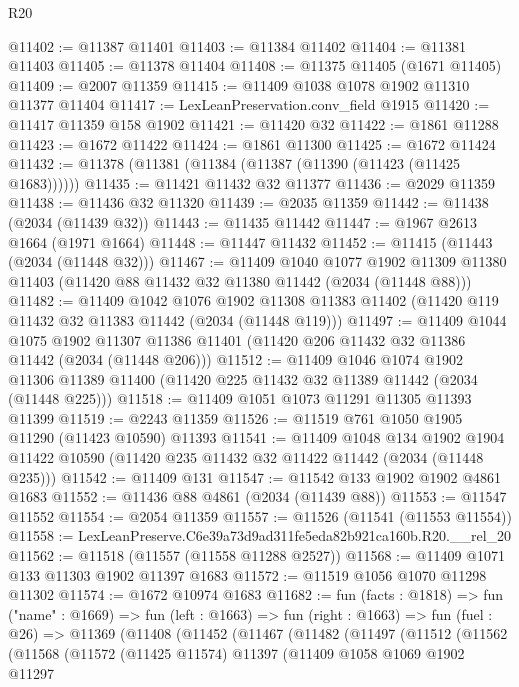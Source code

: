 \begin{lexlean}{R20}
\begin{coremodule}
@11402 := @11387 @11401
@11403 := @11384 @11402
@11404 := @11381 @11403
@11405 := @11378 @11404
@11408 := @11375 @11405 (@1671 @11405)
@11409 := @2007 @11359
@11415 := @11409 @1038 @1078 @1902 @11310 @11377 @11404
@11417 := LexLeanPreservation.conv_field @1915
@11420 := @11417 @11359 @158 @1902
@11421 := @11420 @32
@11422 := @1861 @11288
@11423 := @1672 @11422
@11424 := @1861 @11300
@11425 := @1672 @11424
@11432 := @11378 (@11381 (@11384 (@11387 (@11390 (@11423 (@11425 @1683))))))
@11435 := @11421 @11432 @32 @11377
@11436 := @2029 @11359
@11438 := @11436 @32 @11320
@11439 := @2035 @11359
@11442 := @11438 (@2034 (@11439 @32))
@11443 := @11435 @11442
@11447 := @1967 @2613 @1664 (@1971 @1664)
@11448 := @11447 @11432
@11452 := @11415 (@11443 (@2034 (@11448 @32)))
@11467 := @11409
    @1040
    @1077
    @1902
    @11309
    @11380
    @11403
    (@11420 @88 @11432 @32 @11380 @11442 (@2034 (@11448 @88)))
@11482 := @11409
    @1042
    @1076
    @1902
    @11308
    @11383
    @11402
    (@11420 @119 @11432 @32 @11383 @11442 (@2034 (@11448 @119)))
@11497 := @11409
    @1044
    @1075
    @1902
    @11307
    @11386
    @11401
    (@11420 @206 @11432 @32 @11386 @11442 (@2034 (@11448 @206)))
@11512 := @11409
    @1046
    @1074
    @1902
    @11306
    @11389
    @11400
    (@11420 @225 @11432 @32 @11389 @11442 (@2034 (@11448 @225)))
@11518 := @11409 @1051 @1073 @11291 @11305 @11393 @11399
@11519 := @2243 @11359
@11526 := @11519 @761 @1050 @1905 @11290 (@11423 @10590) @11393
@11541 := @11409
    @1048
    @134
    @1902
    @1904
    @11422
    @10590
    (@11420 @235 @11432 @32 @11422 @11442 (@2034 (@11448 @235)))
@11542 := @11409 @131
@11547 := @11542 @133 @1902 @1902 @4861 @1683
@11552 := @11436 @88 @4861 (@2034 (@11439 @88))
@11553 := @11547 @11552
@11554 := @2054 @11359
@11557 := @11526 (@11541 (@11553 @11554))
@11558 := LexLeanPreserve.C6e39a73d9ad311fe5eda82b921ca160b.R20.__rel_20
@11562 := @11518 (@11557 (@11558 @11288 @2527))
@11568 := @11409 @1071 @133 @11303 @1902 @11397 @1683
@11572 := @11519 @1056 @1070 @11298 @11302
@11574 := @1672 @10974 @1683
@11682 := fun (facts : @1818) =>
  fun ("name" : @1669) =>
  fun (left : @1663) =>
  fun (right : @1663) =>
  fun (fuel : @26) =>
  @11369
    (@11408
      (@11452
        (@11467
          (@11482
            (@11497
              (@11512
                (@11562
                  (@11568
                    (@11572
                      (@11425 @11574)
                      @11397
                      (@11409
                        @1058
                        @1069
                        @1902
                        @11297

\end{coremodule}
\end{lexlean}
